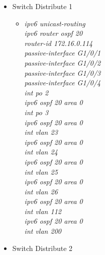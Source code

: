 \documentclass[12pt,a4paper]{report}
\begin{document}
\begin{itemize}
\begin{itemize}
\begin{itemize}
          \end{itemize}
             \item Switch Distribute 1
           
        \begin{itemize}
         \item \textit{ipv6 unicast-routing\\
ipv6 router ospf 20\\
router-id 172.16.0.114\\
passive-interface G1/0/1\\
passive-interface G1/0/2\\
passive-interface G1/0/3\\
passive-interface G1/0/4\\
int po 2\\
ipv6 ospf 20 area 0\\
int po 3\\
ipv6 ospf 20 area 0\\
int vlan 23\\
ipv6 ospf 20 area 0\\
int vlan 24\\
ipv6 ospf 20 area 0\\
int vlan 25\\
ipv6 ospf 20 area 0\\
int vlan 26\\
ipv6 ospf 20 area 0\\
int vlan 112\\
ipv6 ospf 20 area 0\\
int vlan 200\\}
        
          \end{itemize}
             \item Switch Distribute 2
           

\end{itemize}
\end{itemize}
\end{document}
